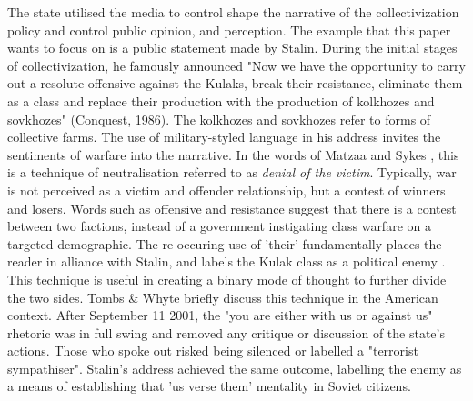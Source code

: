 \documentclass[11pt, a4paper,]{scrartcl}
\begin{document}
The state utilised the media to control shape the narrative of the collectivization policy and control public opinion, and perception. The example that this paper wants to focus on is a public statement made by Stalin. During the initial stages of collectivization, he famously announced "Now we have the opportunity to carry out a resolute offensive against the Kulaks, break their resistance, eliminate them as a class and replace their production with the production of kolkhozes and sovkhozes" (Conquest, 1986). The kolkhozes and sovkhozes refer to forms of collective farms. The use of military-styled language in his address invites the sentiments of warfare into the narrative. In the words of Matzaa and Sykes \citeyear{Matza1964}, this is a technique of neutralisation referred to as \textit{denial of the victim}. Typically, war is not perceived as a victim and offender relationship, but a contest of winners and losers. Words such as offensive and resistance suggest that there is a contest between two factions, instead of a government instigating class warfare on a targeted demographic. The re-occuring use of 'their' fundamentally places the reader in alliance with Stalin, and labels the Kulak class as a political enemy \cite{Neubacher2006}. This technique is useful in creating a binary mode of thought to further divide the two sides. Tombs \& Whyte \citeyear{STEVETOMBSandDAVEWHYTE2002} briefly discuss this technique in the American context. After September 11 2001, the "you are either with us or against us" rhetoric was in full swing and removed any critique or discussion of the state's actions. Those who spoke out risked being silenced or labelled a "terrorist sympathiser". Stalin's address achieved the same outcome, labelling the enemy as a means of establishing that 'us verse them' mentality in Soviet citizens.\par
\end{document}
